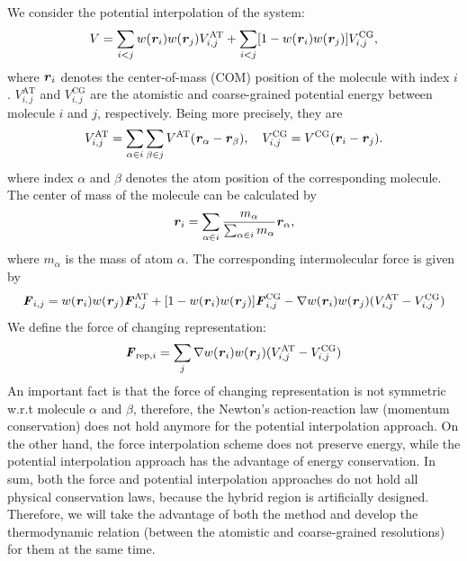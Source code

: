 \documentclass[a4paper,preprint,unsortedaddress]{revtex4-1}
\newcommand{\vect}[1]{\textbf{\textit{#1}}}
\newcommand{\AT}{{\textrm{{AT}}}}
\newcommand{\CG}{{\textrm{CG}}}
\newcommand{\res}{{\textrm{rep}}}
\begin{document}
We consider the potential interpolation of the system:
\begin{align}
  V =
  \sum_{i<j} w(\vect r_i) w(\vect r_j)
  V^\AT_{i,j}
  +
  \sum_{i<j}[1- w(\vect r_i) w(\vect r_j)]
  V^\CG_{i,j},
\end{align}
where  $\vect r_i$ denotes
the center-of-mass (COM) position of the molecule with index $i$.
$V^\AT_{i,j}$ and $V^\CG_{i,j}$ are the atomistic and coarse-grained potential energy between molecule $i$ and $j$, respectively.
Being more precisely, they are
\begin{align}
  V^\AT_{i,j} =
  \sum_{\alpha\in i}\sum_{\beta\in j} V^\AT(\vect r_\alpha - \vect r_\beta),\quad
  V^\CG_{i,j} =
  V^\CG(\vect r_i - \vect r_j).
\end{align}
where index $\alpha$ and $\beta$ denotes the atom position of the corresponding molecule.
The center of mass of the molecule can be calculated by
\begin{align}
  \vect r_i = \sum_{\alpha\in i} \frac{m_\alpha}{\sum_{\alpha\in i} m_\alpha} \vect r_\alpha,
\end{align}
where $m_\alpha$ is the mass of atom $\alpha$.
The
corresponding intermolecular force is given by
\begin{align}\label{eqn:interpol-f}
  \vect F_{i,j} =
  w(\vect r_i) w(\vect r_j)
  \vect F^\AT_{i,j}
  +
  [1- w(\vect r_i) w(\vect r_j)]
  \vect F_{i,j}^\CG
  -
  \nabla w(\vect r_i) w(\vect r_j)
  (V^\AT_{i,j} - V^\CG_{i,j})
\end{align}
We define the force of changing representation:
\begin{align}\label{eqn:frep}
  \vect F_{\res,i} = 
  \sum_j \nabla w(\vect r_i) w(\vect r_j)
  (V^\AT_{i,j} - V^\CG_{i,j})
\end{align}
An important fact is that the force of changing representation is not
symmetric w.r.t molecule $\alpha$ and $\beta$, therefore, the Newton's
action-reaction law (momentum conservation) does not hold anymore for
the potential interpolation approach. On the other hand, the force
interpolation scheme does not preserve
energy, while the potential interpolation
approach has the advantage of energy conservation. In sum, both the
force and potential interpolation approaches do not hold all physical
conservation laws, because the hybrid region is artificially
designed. Therefore, we will take the advantage of both the method and
develop the thermodynamic relation (between the atomistic and
coarse-grained resolutions)  for them at the same time.\\
\end{document}
